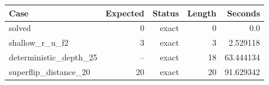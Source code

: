 {\small
\begin{tabular}{lrrrr}
\hline
Case & Expected & Status & Length & Seconds \\
\hline
solved & 0 & exact & 0 & 0.0 \\
shallow\_r\_u\_f2 & 3 & exact & 3 & 2.529118 \\
deterministic\_depth\_25 & -- & exact & 18 & 63.444134 \\
superflip\_distance\_20 & 20 & exact & 20 & 91.629342 \\
\hline
\end{tabular}
}
